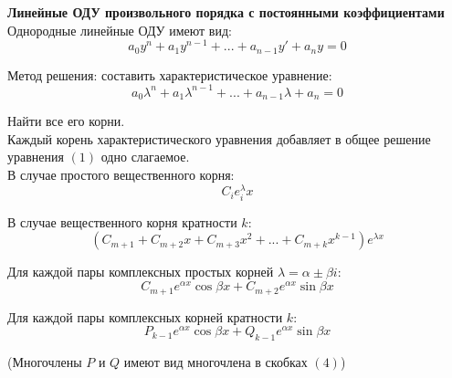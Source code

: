 \documentclass{article}
\begin{document}
	
	\textbf{Линейные ОДУ произвольного порядка с постоянными коэффициентами}\\

	Однородные линейные ОДУ имеют вид:
	\begin{equation}
		a_0y^{n}+a_1y^{n-1}+...+a_{n-1}y'+a_ny=0
	\end{equation}

	Метод решения: составить характеристическое уравнение:
	\begin{equation}
		a_0\lambda^n+a_1\lambda^{n-1}+...+a_{n-1}\lambda+a_n = 0
	\end{equation}

	Найти все его корни.\\

	Каждый корень характеристического уравнения добавляет в общее решение уравнения $(1)$ одно слагаемое.\\

	В случае простого вещественного корня:
	\begin{equation}
		C_ie^\lambda_i x
	\end{equation}

	В случае вещественного корня кратности $k$:
	\begin{equation}
		(C_{m+1}+C_{m+2}x+C_{m+3}x^2+...+C_{m+k}x^{k-1})e^{\lambda x}
	\end{equation}

	Для каждой пары комплексных простых корней $\lambda = \alpha\pm\beta i$:
	\begin{equation}
		C_{m+1}e^{\alpha x}\cos\beta x + C_{m+2}e^{\alpha x}\sin\beta x
	\end{equation}

	Для каждой пары комплексных корней кратности $k$:
	\begin{equation}
		P_{k-1}e^{\alpha x}\cos\beta x + Q_{k-1}e^{\alpha x}\sin\beta x		
	\end{equation}

	(Многочлены $P$ и $Q$ имеют вид многочлена в скобках $(4)$)



	
\end{document}
